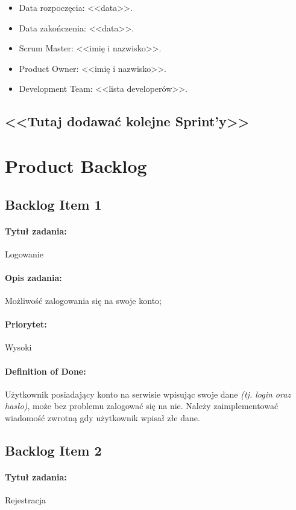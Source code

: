 \documentclass[a4paper]{article}
\begin{document}
	\begin{itemize}
		\item Data rozpoczęcia: <<data>>.
		\item  Data zakończenia: <<data>>.
		\item Scrum Master: <<imię i nazwisko>>.
		\item Product Owner: <<imię i nazwisko>>.
		\item Development Team: <<lista developerów>>.
	\end{itemize}
	
	\subsection*{<<Tutaj dodawać kolejne Sprint'y>>}
	
	\section{Product Backlog}
	
	\subsection{Backlog Item 1}
	\paragraph{Tytuł zadania:} Logowanie
	\paragraph{Opis zadania:} Możliwość zalogowania się na swoje konto;
	\paragraph{Priorytet:} Wysoki
	\paragraph{Definition of Done:} Użytkownik posiadający konto na serwisie wpisując swoje dane \emph{(tj. login oraz hasło)}, może bez problemu zalogować się na nie. Należy zaimplementować wiadomość zwrotną gdy użytkownik wpisał złe dane.
	
	\subsection{Backlog Item 2}
	\paragraph{Tytuł zadania:} Rejestracja
\end{document}
